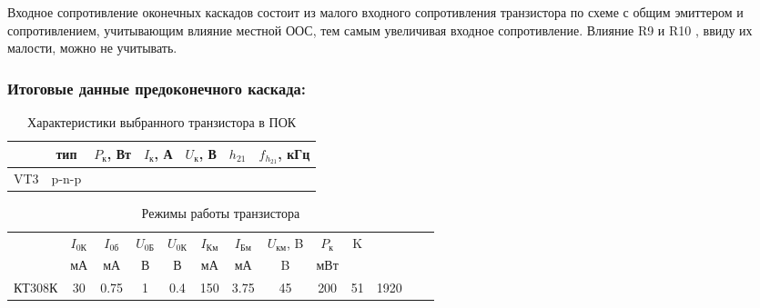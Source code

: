 Входное сопротивление оконечных каскадов состоит из малого входного сопротивления транзистора по схеме с общим эмиттером и сопротивлением, учитывающим влияние местной ООС, тем самым увеличивая входное сопротивление.  Влияние R9 и R10 , ввиду их малости, можно не учитывать. \par

\subsubsection{Итоговые данные предоконечного каскада:}

\begin{table}[htbp]
\caption{Характеристики выбранного транзистора в ПОК}
\begin{center}\begin{tabular}{|c|c|c|c|c|c|c|}
\hline 
  & тип & $P_{\text{к}}$, Вт & $I_{\text{к}}$, А & $U_{\text{к}}$, В & $h_{21}$ &  $f_{h_{21}}$, кГц \\ 
\hline 
VT3 & p-n-p &   &  &  &  & \\ 
\hline 
\end{tabular} 
\end{center}
\end{table}

\begin{table}[htbp]
\caption{Режимы работы транзистора}
\begin{center}\begin{tabular}{|c|c|c|c|c|c|c|c|c|c|c|c|c|}
\hline 
   & $I_\text{0К}$ & $I_\text{0б}$& $U_\text{0Б}$ & $U_\text{0К}$&  $I_{\text{Км}}$  & $I_{\text{Бм}}$& $U_{\text{км}}$, B & $P_{\text{к}}$ & K\\ 
  & мА & мА& В & В & мА & мА & B & мВт & \\
\hline 
КТ308К & 30 & 0.75 & 1 & 0.4 & 150 & 3.75 & 45 & 200 & 51 & 1920 \\
\hline
\end{tabular} 
\end{center}
\end{table}